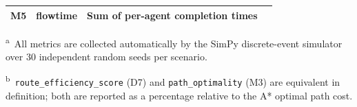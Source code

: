 \begin{table}[htbp]
\begin{threeparttable}
\begin{tabular}{clll}
      M5 & flowtime             & Sum of per-agent completion times                 &                \\
      \bottomrule
    \end{tabular}
    \begin{tablenotes}
      \footnotesize
      \item \textsuperscript{a}~All metrics are collected automatically by the SimPy
            discrete-event simulator over 30 independent random seeds per scenario.
      \item \textsuperscript{b}~\texttt{route\_efficiency\_score} (D7) and
            \texttt{path\_optimality} (M3) are equivalent in definition;
            both are reported as a percentage relative to the A* optimal path cost.
    \end{tablenotes}
  \end{threeparttable}
\end{table}


